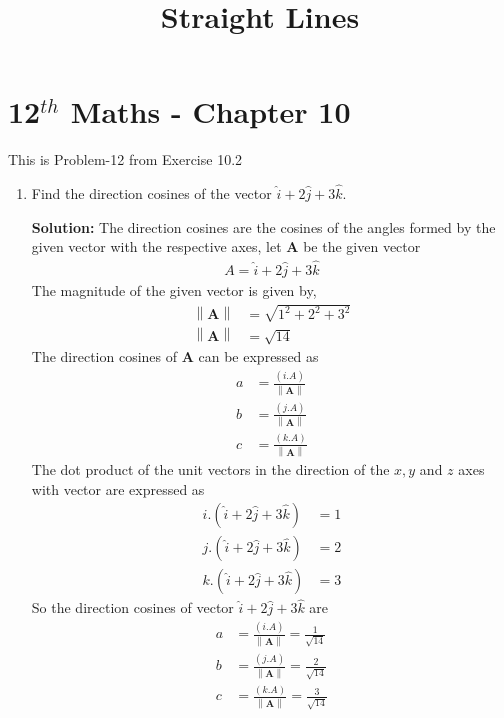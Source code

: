 \documentclass[12pt]{article}
\providecommand{\norm}[1]{\left\lVert#1\right\rVert}
\newcommand{\solution}{\noindent \textbf{Solution: }}
\let\vec\mathbf
\begin{document}
\begin{center}
\enlargethispage{-4cm}
\title{\textbf{Straight Lines}}
\date{\vspace{-5ex}} %
\maketitle
\end{center}
\setcounter{page}{1}
\section*{12$^{th}$ Maths - Chapter 10}
This is Problem-12 from Exercise 10.2
\begin{enumerate}
\item Find the direction cosines of the vector $\hat{i} +2\hat{j}+3\hat{k}$.

\solution The direction cosines are the cosines of the angles formed by the given vector with the respective axes, let $\vec{A}$ be the given vector
\begin{align}
A =\hat{i} +2\hat{j}+3\hat{k}
\end{align}
The magnitude of the given vector is given by,
\begin{align}
\norm{\vec{A}}&=\sqrt{1^2+2^2+3^2}\\
\norm{\vec{A}} &=\sqrt{14}
\end{align}
The direction cosines of $\vec{A}$ can be expressed as
\begin{align}
a &=\frac{(i.A)}{\norm{\vec{A}}}\\
b &=\frac{(j.A)}{\norm{\vec{A}}}\\
c &=\frac{(k.A)}{\norm{\vec{A}}}
\end{align}
The dot product of the unit vectors in the direction of the $x,y$ and $z$ axes with vector are expressed as
\begin{align}
i.(\hat{i} +2\hat{j}+3\hat{k}) &=1\\
j.(\hat{i} +2\hat{j}+3\hat{k}) &=2\\
k.(\hat{i} +2\hat{j}+3\hat{k}) &=3
\end{align}
So the direction cosines of vector $\hat{i} +2\hat{j}+3\hat{k}$ are
\begin{align}
a &=\frac{(i.A)}{\norm{\vec{A}}}= \frac{1}{\sqrt{14}}\\
b &=\frac{(j.A)}{\norm{\vec{A}}}= \frac{2}{\sqrt{14}}\\
c &=\frac{(k.A)}{\norm{\vec{A}}}= \frac{3}{\sqrt{14}}
\end{align}



\end{enumerate}
\end{document}
